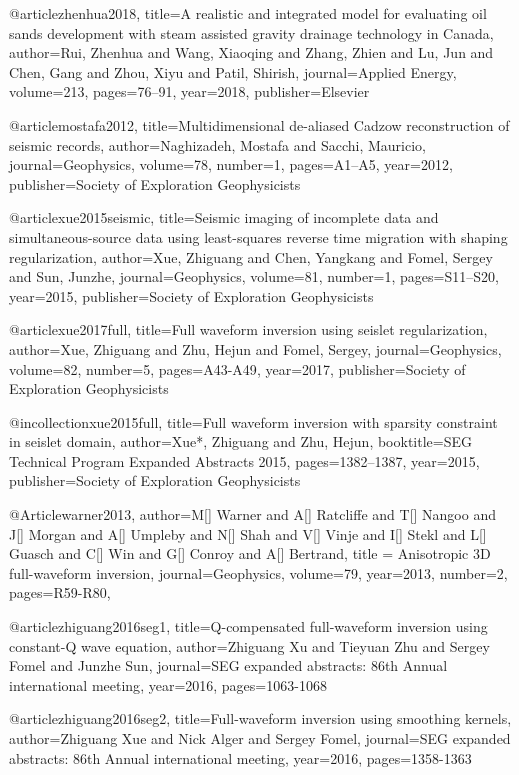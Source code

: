 @article{zhenhua2018,
  title={A realistic and integrated model for evaluating oil sands development with steam assisted gravity drainage technology in Canada},
  author={Rui, Zhenhua and Wang, Xiaoqing and Zhang, Zhien and Lu, Jun and Chen, Gang and Zhou, Xiyu and Patil, Shirish},
  journal={Applied Energy},
  volume={213},
  pages={76--91},
  year={2018},
  publisher={Elsevier}
}

@article{mostafa2012,
  title={Multidimensional de-aliased Cadzow reconstruction of seismic records},
  author={Naghizadeh, Mostafa and Sacchi, Mauricio},
  journal={Geophysics},
  volume={78},
  number={1},
  pages={A1--A5},
  year={2012},
  publisher={Society of Exploration Geophysicists}
}

@article{xue2015seismic,
  title={Seismic imaging of incomplete data and simultaneous-source data using least-squares reverse time migration with shaping regularization},
  author={Xue, Zhiguang and Chen, Yangkang and Fomel, Sergey and Sun, Junzhe},
  journal={Geophysics},
  volume={81},
  number={1},
  pages={S11--S20},
  year={2015},
  publisher={Society of Exploration Geophysicists}
}

@article{xue2017full,
  title={Full waveform inversion using seislet regularization},
  author={Xue, Zhiguang and Zhu, Hejun and Fomel, Sergey},
  journal={Geophysics},
  volume={82},
  number={5},
  pages={A43-A49},
  year={2017},
  publisher={Society of Exploration Geophysicists}
}

@incollection{xue2015full,
  title={Full waveform inversion with sparsity constraint in seislet domain},
  author={Xue*, Zhiguang and Zhu, Hejun},
  booktitle={SEG Technical Program Expanded Abstracts 2015},
  pages={1382--1387},
  year={2015},
  publisher={Society of Exploration Geophysicists}
}


@Article{warner2013,
  author={M[] Warner and A[] Ratcliffe and T[] Nangoo and J[] Morgan and A[] Umpleby and N[] Shah and V[] Vinje and I[] Stekl and L[] Guasch and C[] Win and G[] Conroy and A[] Bertrand},
  title = {Anisotropic 3{D} full-waveform inversion},
  journal={Geophysics},
  volume=79,
  year=2013,
  number=2,
  pages={R59-R80},
}


@article{zhiguang2016seg1,
  title={Q-compensated full-waveform inversion using constant-Q wave equation},
  author={Zhiguang Xu and Tieyuan Zhu and Sergey Fomel and Junzhe Sun},
  journal={SEG expanded abstracts: 86th Annual international meeting},
  year={2016},
  pages={1063-1068}
}

@article{zhiguang2016seg2,
  title={Full-waveform inversion using smoothing kernels},
  author={Zhiguang Xue and Nick Alger and Sergey Fomel},
  journal={SEG expanded abstracts: 86th Annual international meeting},
  year={2016},
  pages={1358-1363}
}

